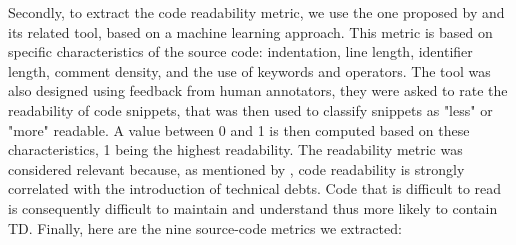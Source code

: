 
Secondly, to extract the code readability metric, we use the one proposed by \citet{Buse:tse2010} and its related tool, based on a machine learning approach. This metric is based on specific characteristics of the source code: indentation, line length, identifier length, comment density, and the use of keywords and operators. The tool was also designed using feedback from human annotators, they were asked to rate the readability of code snippets, that was then used to classify snippets as "less" or "more" readable. A value between 0 and 1 is then computed based on these characteristics, 1 being the highest readability. The readability metric was considered relevant because, as mentioned by \citet{BavotaR16}, code readability is strongly correlated with the introduction of technical debts. Code that is difficult to read is consequently difficult to maintain and understand \citep{Buse:tse2010} thus more likely to contain \ac{TD}. Finally, here are the nine source-code metrics we extracted: \par

